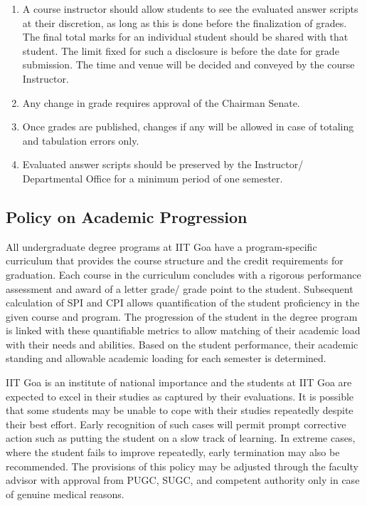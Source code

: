 \begin{enumerate}[leftmargin=15mm]
    \item A course instructor should allow students to see the evaluated answer scripts at their discretion, as long as this is done before the finalization of grades. The final total marks for an individual student should be shared with that student. The limit fixed for such a disclosure is before the date for grade submission. The time and venue will be decided and conveyed by the course Instructor.
    \item Any change in grade requires approval of the Chairman Senate.
    \item Once grades are published, changes if any will be allowed in case of totaling and tabulation errors only. 
    \item Evaluated answer scripts should be preserved by the Instructor/ Departmental Office for a minimum period of one semester. 
\end{enumerate}

\subsection{Policy on Academic Progression \label{lab: Academic Progression Policy}}

All undergraduate degree programs at IIT Goa have a program-specific curriculum that provides the course structure and the credit requirements for graduation. Each course in the curriculum concludes with a rigorous performance assessment and award of a letter grade/ grade point to the student. Subsequent calculation of SPI and CPI allows quantification of the student proficiency in the given course and program. The progression of the student in the degree program is linked with these quantifiable metrics to allow matching of their academic load with their needs and abilities. Based on the student performance, their academic standing and allowable academic loading for each semester is determined. 

IIT Goa is an institute of national importance and the students at IIT Goa are expected to excel in their studies as captured by their evaluations. It is possible that some students may be unable to cope with their studies repeatedly despite their best effort. Early recognition of such cases will permit prompt corrective action such as putting the student on a slow track of learning. In extreme cases, where the student fails to improve repeatedly, early termination may also be recommended. The provisions of this policy may be adjusted through the faculty advisor with approval from PUGC, SUGC, and competent authority only in case of genuine medical reasons.

